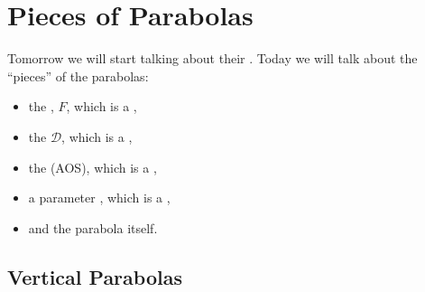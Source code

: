 \section{Pieces of Parabolas}

Tomorrow we will start talking about their .
Today  we will talk about the ``pieces'' of the parabolas:
\begin{itemize}[nosep]
    \item the , $F$, which is a ,
    \item the  $\mathscr{D}$, which is a ,
    \item the    (AOS), which is a ,
    \item a parameter , which is a ,
    \item and the parabola itself.
\end{itemize}

\subsection{Vertical Parabolas} 

